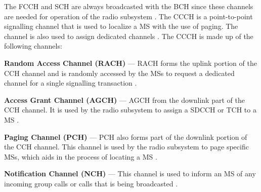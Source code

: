 The FCCH and SCH are always broadcasted with the BCH since these channels are needed for operation of the radio subsystem \cite{GSMArchitectureProtocolsServices}. The CCCH is a point-to-point signalling channel that is used to localize a MS with the use of paging. The channel is also used to assign dedicated channels \cite{GSMArchitectureProtocolsServices}. The CCCH is made up of the following channels:
\begin{description}
\item{\textbf{Random Access Channel (RACH)}} --- RACH forms the uplink portion of the CCH channel and is randomly accessed by the MSs to request a dedicated channel for a single signalling transaction \cite{GSMArchitectureProtocolsServices}.
\item{\textbf{Access Grant Channel (AGCH)}} --- AGCH from the downlink part of the CCH channel. It is used by the radio subsystem to assign a SDCCH or TCH to a MS \cite{GSMArchitectureProtocolsServices}.
\item{\textbf{Paging Channel (PCH)}} --- PCH also forms part of the downlink portion of the CCH channel. This channel is used by the radio subsystem to page specific MSs, which aids in the process of locating a MS \cite{GSMArchitectureProtocolsServices}.
\item{\textbf{Notification Channel (NCH)}} --- This channel is used to inform an MS of any incoming group calls or calls that is being broadcasted \cite{GSMArchitectureProtocolsServices}.
\end{description}

